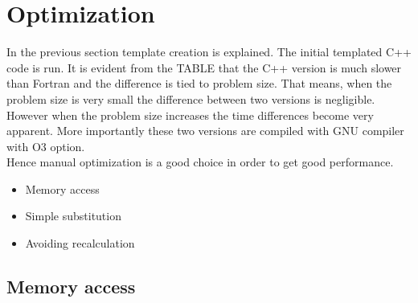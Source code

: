 \section{Optimization}

In the previous section template creation is explained. The initial templated C++ code is run. It is evident from the TABLE that the C++ version is much slower than Fortran and the difference is tied to problem size. That means, when the problem size is very small the difference between two versions is negligible. However when the problem size increases the time differences become very apparent. More importantly these two versions are compiled with GNU compiler with O3 option.\\
 
Hence manual optimization is a good choice in order to get good performance. 

\begin{itemize}
	\item Memory access
	\item Simple substitution 
	\item Avoiding recalculation 
\end{itemize}     

\subsection{Memory access}
 